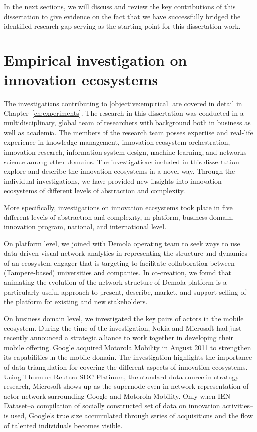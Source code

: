 In the next sections, we will discuss and review the key contributions of this dissertation to give evidence on the fact that we have successfully bridged the identified research gap serving as the starting point for this dissertation work. 

\section{Empirical investigation on innovation ecosystems}

The investigations contributing to \ref{objective:empirical} are covered in detail in Chapter~\ref{ch:experiments}. The research in this dissertation was conducted in a multidisciplinary, global team of researchers with background both in business as well as academia. The members of the research team posses expertise and real-life experience in knowledge management, innovation ecosystem orchestration, innovation research, information system design, machine learning, and networks science among other domains. The investigations included in this dissertation explore and describe the innovation ecosystems in a novel way. Through the individual investigations, we have provided new insights into innovation ecosystems of different levels of abstraction and complexity.

More specifically, investigations on innovation ecosystems took place in five different levels of abstraction and complexity, in  platform, business domain, innovation program, national, and international level.

On platform level, we joined with Demola operating team to seek ways to use data-driven visual network analytics in representing the structure and dynamics of an ecosystem engager that is targeting to facilitate collaboration between (Tampere-based) universities and companies. In co-creation, we found that animating the evolution of the network structure of Demola platform is a particularly useful approach to present, describe, market, and support selling of the platform for existing and new stakeholders.

On business domain level, we investigated the key pairs of actors in the mobile ecosystem. During the time of the investigation, Nokia and Microsoft had just recently announced a strategic alliance to work together in developing their mobile offering. Google acquired Motorola Mobility in August 2011 to strengthen its capabilities in the mobile domain. The investigation highlights the importance of data triangulation for covering the different aspects of innovation ecosystems. Using Thomson Reuters SDC Platinum, the standard data source in strategy research, Microsoft shows up as the supernode even in network representation of actor network surrounding Google and Motorola Mobility. Only when IEN Dataset--a compilation of socially constructed set of data on innovation activities--is used, Google’s true size accumulated through series of acquisitions and the flow of talented individuals becomes visible.

